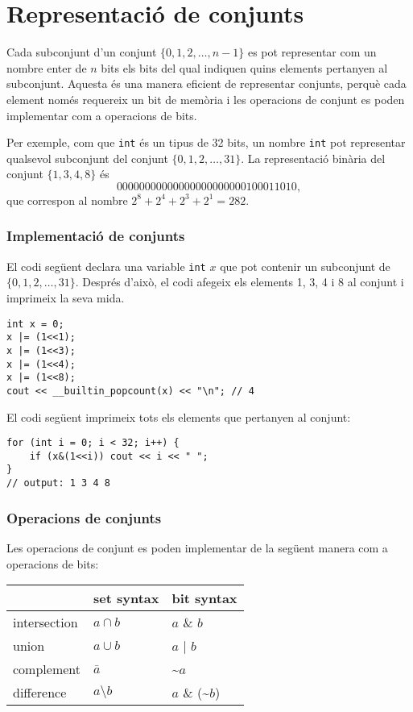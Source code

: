 \section{Representació de conjunts}

Cada subconjunt d'un conjunt $\{0,1,2,\ldots,n-1\}$ es pot representar
com un nombre enter de $n$ bits els bits del qual indiquen quins
elements pertanyen al subconjunt. Aquesta és una manera eficient de
representar conjunts, perquè cada element només requereix un bit de
memòria i les operacions de conjunt es poden implementar com a
operacions de bits.

Per exemple, com que \texttt{int} és un tipus de 32 bits, un nombre
\texttt{int} pot representar qualsevol subconjunt del conjunt
$\{0,1,2,\ldots,31\}$. La representació binària del conjunt
$\{1,3,4,8\}$ és
\[00000000000000000000000100011010,\]
que correspon al nombre $2^8+2^4+2^3+2^1=282$.

\subsubsection{Implementació de conjunts}

El codi següent declara una variable \texttt{int} $x$ que pot contenir
un subconjunt de $\{0,1,2,\ldots,31\}$. Després d'això, el codi
afegeix els elements 1, 3, 4 i 8 al conjunt i imprimeix la seva mida.
\begin{lstlisting}
int x = 0;
x |= (1<<1);
x |= (1<<3);
x |= (1<<4);
x |= (1<<8);
cout << __builtin_popcount(x) << "\n"; // 4
\end{lstlisting}
El codi següent imprimeix tots els elements que pertanyen al conjunt:
\begin{lstlisting}
for (int i = 0; i < 32; i++) {
    if (x&(1<<i)) cout << i << " ";
}
// output: 1 3 4 8
\end{lstlisting}


\subsubsection{Operacions de conjunts}

Les operacions de conjunt es poden implementar de la següent manera
com a operacions de bits:


\begin{center}
\begin{tabular}{lll}
& set syntax & bit syntax \\
\hline
intersection & $a \cap b$ & $a$ \& $b$ \\
union & $a \cup b$ & $a$ | $b$ \\
complement & $\bar a$ & \textasciitilde$a$ \\
difference & $a \setminus b$ & $a$ \& (\textasciitilde$b$) \\
\end{tabular}
\end{center}


